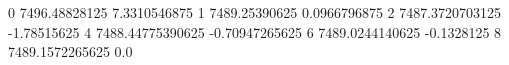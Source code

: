 0 7496.48828125 7.3310546875
1 7489.25390625 0.0966796875
2 7487.3720703125 -1.78515625
4 7488.44775390625 -0.70947265625
6 7489.0244140625 -0.1328125
8 7489.1572265625 0.0
